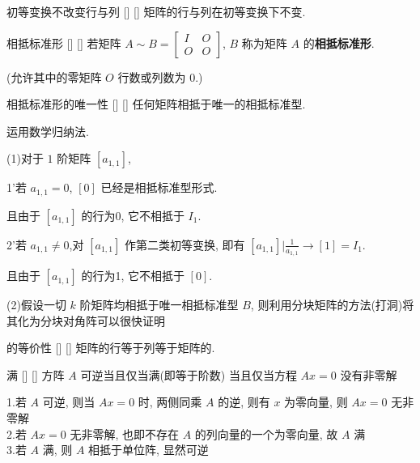 \documentclass[UTF8]{ctexart}
\DeclareMathOperator{\0}{\mathbf{0}}
\DeclareMathOperator{\<}{\langle}
\renewcommand{\>}{\rangle}
\begin{document}
		\begin{ppt}
			[]
			{初等变换不改变行\秩 与列\秩}
			[]
			[]
			矩阵的行\秩 与列\秩 在初等变换下不变. 
		\end{ppt}
		
		\begin{dfn}
			[]
			{相抵标准形}
			[]
			[]
			若矩阵 \(A\sim B=
			\begin{bmatrix}
			I & O \\
			O & O 
			\end{bmatrix}\),  \(B\) 称为矩阵 \(A\) 的\textbf{相抵标准形}. 
			
			(允许其中的零矩阵 \(O\) 行数或列数为 \(0\).)
		\end{dfn}
		
		\begin{ppt}
			[]
			{相抵标准形的唯一性}
			[]
			[]
			任何矩阵相抵于唯一的相抵标准型. 
		\end{ppt}
  
		\begin{prf}
			运用数学归纳法. 
			
			(1)对于 \(1\) 阶矩阵 \([a_{1,1}]\), 
			
			1'若 \(a_{1,1}=0\),  \([0]\) 已经是相抵标准型形式. 
			
			且由于 \([a_{1,1}]\) 的行\秩 为0, 它不相抵于 \(I_1\). 
			
			2'若 \(a_{1,1}\neq 0\),对 \([a_{1,1}]\) 作第二类初等变换, 即有 \([a_{1,1}]|\frac{1}{a_{1,1}}\longrightarrow[1]=I_1. \) 
			
			且由于 \([a_{1,1}]\) 的行\秩 为1, 它不相抵于 \([0]\). 
			
			(2)假设一切 \(k\) 阶矩阵均相抵于唯一相抵标准型 \(B\), 则利用分块矩阵的方法(打洞)将其化为分块对角阵可以很快证明
		\end{prf}
  
		\begin{thm}
			[]
			{\秩 的等价性}
			[]
			[]
			矩阵的行\秩 等于列\秩 等于矩阵的\秩. 
		\end{thm}
  
        \begin{thm}
			[]
			{满\秩}
			[]
			[]
            方阵 \(A\) 可逆当且仅当满\秩(即\秩 等于阶数) 当且仅当方程 \(Ax=0\) 没有非零解
        \end{thm}
        
        \begin{prf}
            1.若 \(A\) 可逆, 则当 \(Ax=0\) 时, 两侧同乘 \(A\) 的逆, 则有 \(x\) 为零向量, 则 \(Ax=0\) 无非零解\\
            2.若 \(Ax=0\) 无非零解, 也即不存在 \(A\) 的列向量的一个 为零向量, 故 \(A\) 满\秩\\
            3.若 \(A\) 满\秩, 则 \(A\) 相抵于单位阵, 显然可逆
        \end{prf}
        
\end{document}
